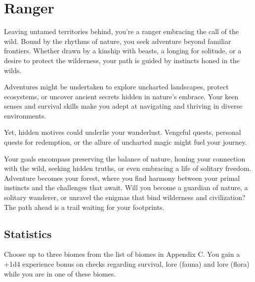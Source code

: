 \section{Ranger}\label{background:ranger}
Leaving untamed territories behind, you're a ranger embracing the call of the wild.
Bound by the rhythms of nature, you seek adventure beyond familiar frontiers.
Whether drawn by a kinship with beasts, a longing for solitude, or a desire to protect the wilderness, your path is guided by instincts honed in the wilds.

Adventures might be undertaken to explore uncharted landscapes, protect ecosystems, or uncover ancient secrets hidden in nature's embrace.
Your keen senses and survival skills make you adept at navigating and thriving in diverse environments.

Yet, hidden motives could underlie your wanderlust.
Vengeful quests, personal quests for redemption, or the allure of uncharted magic might fuel your journey.

Your goals encompass preserving the balance of nature, honing your connection with the wild, seeking hidden truths, or even embracing a life of solitary freedom.
Adventure becomes your forest, where you find harmony between your primal instincts and the challenges that await.
Will you become a guardian of nature, a solitary wanderer, or unravel the enigmas that bind wilderness and civilization?
The path ahead is a trail waiting for your footprints.


\subsection{Statistics}
Choose up to three biomes from the list of biomes in Appendix C.
You gain a +1d4 experience bonus on checks regarding survival, lore (fauna) and lore (flora) while you are in one of these biomes.
